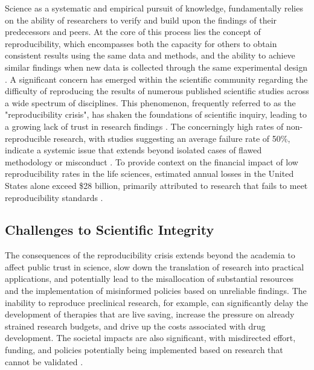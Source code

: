 \documentclass[final]{rc-book-2.14}
\begin{document}
Science as a systematic and empirical pursuit of knowledge, fundamentally relies on the ability of researchers to verify and build upon the findings of their predecessors and peers. At the core of this process lies the concept of reproducibility, which encompasses both the capacity for others to obtain consistent results using the same data and methods, and the ability to achieve similar findings when new data is collected through the same experimental design \cite{pellizzari_reproducibility_2017, committee_2019}. A significant concern has emerged within the scientific community regarding the difficulty of reproducing the results of numerous published scientific studies across a wide spectrum of disciplines. This phenomenon, frequently referred to as the "reproducibility crisis", has shaken the foundations of scientific inquiry, leading to a growing lack of trust in research findings \cite{baker2016reproducibility}. The concerningly high rates of non-reproducible research, with studies suggesting an average failure rate of 50\%, indicate a systemic issue that extends beyond isolated cases of flawed methodology or misconduct \cite{branch_reproducibility_2019}. To provide context on the financial impact of low reproducibility rates in the life sciences, estimated annual losses in the United States alone exceed \$28 billion, primarily attributed to research that fails to meet reproducibility standards \cite{freedman2015economics}.


\subsection{Challenges to Scientific Integrity}

The consequences of the reproducibility crisis extends beyond the academia to affect public trust in science, slow down the translation of research into practical applications, and potentially lead to the misallocation of substantial resources and the implementation of misinformed policies based on unreliable findings. The inability to reproduce preclinical research, for example, can significantly delay the development of therapies that are live saving, increase the pressure on already strained research budgets, and drive up the costs associated with drug development. The societal impacts are also significant, with misdirected effort, funding, and policies potentially being implemented based on research that cannot be validated \cite{freedman2015economics}.
\end{document}
